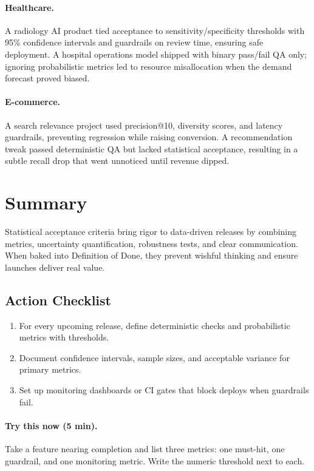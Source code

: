 \paragraph{Healthcare.} A radiology AI product tied acceptance to sensitivity/specificity thresholds with 95\% confidence intervals and guardrails on review time, ensuring safe deployment. A hospital operations model shipped with binary pass/fail QA only; ignoring probabilistic metrics led to resource misallocation when the demand forecast proved biased.

\paragraph{E-commerce.} A search relevance project used precision@10, diversity scores, and latency guardrails, preventing regression while raising conversion. A recommendation tweak passed deterministic QA but lacked statistical acceptance, resulting in a subtle recall drop that went unnoticed until revenue dipped.

\section{Summary}
\label{sec:stats-acceptance-summary}

Statistical acceptance criteria bring rigor to data-driven releases by combining metrics, uncertainty quantification, robustness tests, and clear communication. When baked into Definition of Done, they prevent wishful thinking and ensure launches deliver real value.

\subsection{Action Checklist}
\begin{enumerate}
    \item For every upcoming release, define deterministic checks and probabilistic metrics with thresholds.
    \item Document confidence intervals, sample sizes, and acceptable variance for primary metrics.
    \item Set up monitoring dashboards or CI gates that block deploys when guardrails fail.
\end{enumerate}

\paragraph{Try this now (5 min).} Take a feature nearing completion and list three metrics: one must-hit, one guardrail, and one monitoring metric. Write the numeric threshold next to each.

